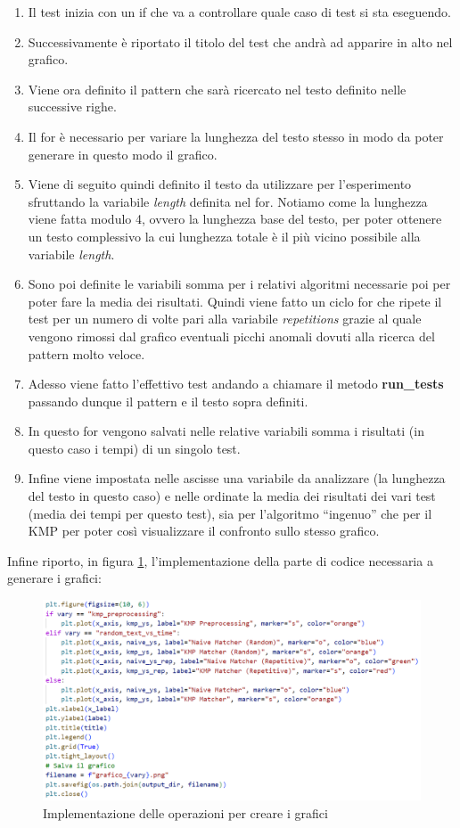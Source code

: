 \documentclass{article}
\begin{document}
\begin{enumerate}
    \item Il test inizia con un if che va a controllare quale caso di test si sta eseguendo.
    \item Successivamente è riportato il titolo del test che andrà ad apparire in alto nel grafico.
    \item Viene ora definito il pattern che sarà ricercato nel testo definito nelle successive righe.
    \item Il for è necessario per variare la lunghezza del testo stesso in modo da poter generare in questo modo il grafico.
    \item Viene di seguito quindi definito il testo da utilizzare per l'esperimento sfruttando la variabile \textit{length} definita nel for. Notiamo come la lunghezza viene fatta modulo 4, ovvero la lunghezza base del testo, per poter ottenere un testo complessivo la cui lunghezza totale è il più vicino possibile alla variabile \textit{length}.
    \item Sono poi definite le variabili somma per i relativi algoritmi necessarie poi per poter fare la media dei risultati. Quindi viene fatto un ciclo for che ripete il test per un numero di volte pari alla variabile \textit{repetitions} grazie al quale vengono rimossi dal grafico eventuali picchi anomali dovuti alla ricerca del pattern molto veloce.
    \item Adesso viene fatto l'effettivo test andando a chiamare il metodo \textbf{run\_tests} passando dunque il pattern e il testo sopra definiti.
    \item In questo for vengono salvati nelle relative variabili somma i risultati (in questo caso i tempi) di un singolo test.
    \item Infine viene impostata nelle ascisse una variabile da analizzare (la lunghezza del testo in questo caso) e nelle ordinate la media dei risultati dei vari test (media dei tempi per questo test), sia per l'algoritmo ``ingenuo'' che per il KMP per poter così visualizzare il confronto sullo stesso grafico.
\end{enumerate}
Infine riporto, in figura \ref{fig:plot-graphs}, l'implementazione della parte di codice necessaria a generare i grafici:
\begin{figure}[H]
    \centering
    \includegraphics[width=1\textwidth]{img/Plot_graphs.png}
    \caption{Implementazione delle operazioni per creare i grafici}
    \label{fig:plot-graphs}
\end{figure}
\end{document}
